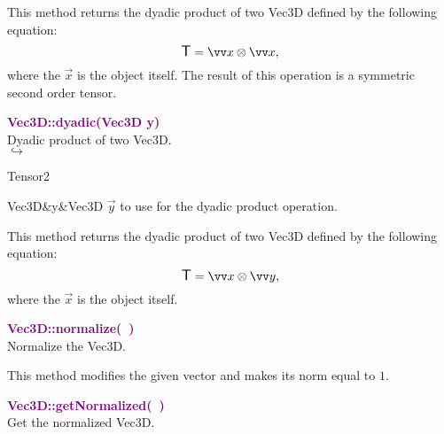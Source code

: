 This method returns the dyadic product of two Vec3D defined by the following equation:
\begin{equation*}
\T = \overrightarrow{x}\otimes\overrightarrow{x},
\end{equation*}
where the $\overrightarrow{x}$ is the object itself. The result of this operation is a symmetric second order tensor.

\textcolor{purple}{\textbf{Vec3D::dyadic(Vec3D y)}}\label{Vec3D::dyadic(Vec3D y)}\\
Dyadic product of two Vec3D.\\ \hspace*{5mm}$\hookrightarrow$
\vspace*{-2em}\begin{tcolorbox}[grow to left by=-1cm, width=\textwidth-1cm,myArgs,tabularx={l|R}]
Tensor2
\end{tcolorbox}

\begin{tcolorbox}[width=\textwidth,myArgs,tabularx={ll|R}]
Vec3D&y&Vec3D $\overrightarrow{y}$ to use for the dyadic product operation.
\end{tcolorbox}

This method returns the dyadic product of two Vec3D defined by the following equation:
\begin{equation*}
\T = \overrightarrow{x}\otimes\overrightarrow{y},
\end{equation*}
where the $\overrightarrow{x}$ is the object itself.

\textcolor{purple}{\textbf{Vec3D::normalize(~)}}\label{Vec3D::normalize()}\\
Normalize the Vec3D.

This method modifies the given vector and makes its norm equal to $1$.

\textcolor{purple}{\textbf{Vec3D::getNormalized(~)}}\label{Vec3D::getNormalized()}\\
Get the normalized Vec3D.

